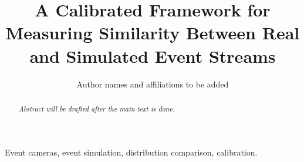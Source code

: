 \title{A Calibrated Framework for Measuring Similarity Between Real and Simulated Event Streams}
\author{Author names and affiliations to be added}
\maketitle

\begin{abstract}
\textit{Abstract will be drafted after the main text is done.}
\end{abstract}

\begin{IEEEkeywords}
Event cameras, event simulation, distribution comparison, calibration.
\end{IEEEkeywords}








